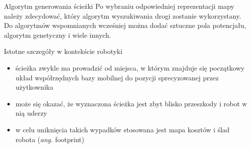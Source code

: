 \begin{frame}
{Algorytm generowania ścieżki}
	Po wybraniu odpowiedniej reprezentacji mapy należy zdecydować, który algorytm wyszukiwania drogi zostanie wykorzystany.
	Do algorytmów wspomnianych wcześniej można dodać sztuczne pola potencjału, algorytm genetyczny i wiele innych.
\end{frame}

\begin{frame}
{Istotne szczegóły w kontekście robotyki}
	\begin{itemize}
		\item ścieżka zwykle ma prowadzić od miejsca, w którym znajduje się początkowy układ współrzędnych bazy mobilnej do pozycji sprecyzowanej przez użytkownika
		\item może się okazać, że wyznaczona ścieżka jest zbyt blisko przeszkody i robot w nią uderzy
		\item w celu uniknięcia takich wypadków stosowana jest mapa kosztów i ślad robota (\textit{ang.} footprint)
	\end{itemize}
\end{frame}